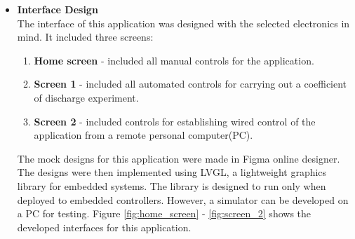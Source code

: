 \begin{itemize}
     \item \textbf{Interface Design}\\
     The interface of this application was designed with the selected electronics in mind. It included three screens:
     \begin{enumerate}
         \item \textbf{Home screen} - included all manual controls for the application.
         \item \textbf{Screen 1} - included all automated controls for carrying out a coefficient of discharge experiment.
         \item \textbf{Screen 2} - included controls for establishing wired control of the application from a remote personal computer(PC).
     \end{enumerate}
     The mock designs for this application were made in Figma online designer. The designs were then implemented using LVGL, a lightweight graphics library for embedded systems. The library is designed to run only when deployed to embedded controllers. However, a simulator can be developed on a PC for testing.
     Figure \ref{fig:home_screen} - \ref{fig:screen_2} shows the developed interfaces for this application.


\end{itemize}
